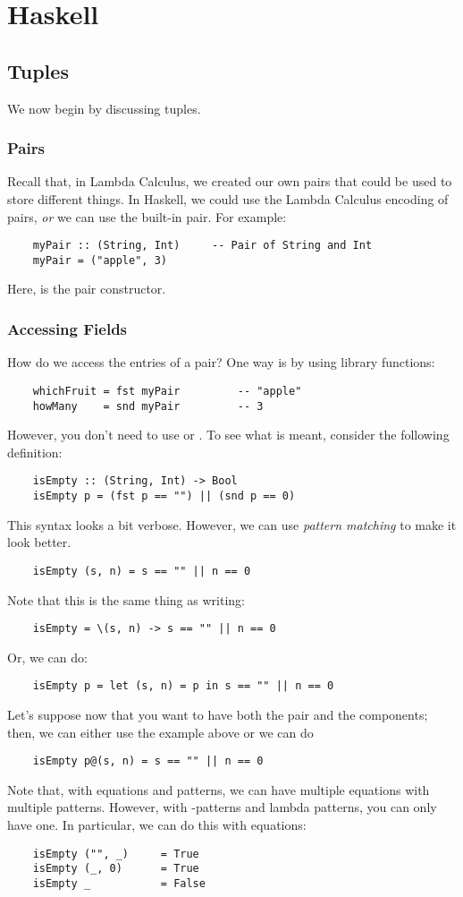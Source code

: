 \documentclass[letterpaper]{article}
\begin{document}
\section{Haskell}

\subsection{Tuples}
We now begin by discussing tuples.

\subsubsection{Pairs}
Recall that, in Lambda Calculus, we created our own pairs that could be used to store different things. In Haskell, we could use the Lambda Calculus encoding of pairs, \emph{or} we can use the built-in pair. For example: 
\begin{verbatim}
    myPair :: (String, Int)     -- Pair of String and Int 
    myPair = ("apple", 3)\end{verbatim}
Here, \code{(,)} is the pair constructor. 

\subsubsection{Accessing Fields}
How do we access the entries of a pair? One way is by using library functions:
\begin{verbatim}
    whichFruit = fst myPair         -- "apple"
    howMany    = snd myPair         -- 3 \end{verbatim}
However, you don't need to use  or . To see what is meant, consider the following definition: 
\begin{verbatim}
    isEmpty :: (String, Int) -> Bool 
    isEmpty p = (fst p == "") || (snd p == 0)\end{verbatim}
This syntax looks a bit verbose. However, we can use \emph{pattern matching} to make it look better.
\begin{verbatim}
    isEmpty (s, n) = s == "" || n == 0\end{verbatim}
Note that this is the same thing as writing: 
\begin{verbatim}
    isEmpty = \(s, n) -> s == "" || n == 0\end{verbatim}
Or, we can do: 
\begin{verbatim}
    isEmpty p = let (s, n) = p in s == "" || n == 0\end{verbatim}
Let's suppose now that you want to have both the pair and the components; then, we can either use the example above or we can do 
\begin{verbatim}
    isEmpty p@(s, n) = s == "" || n == 0\end{verbatim}
Note that, with equations and patterns, we can have multiple equations with multiple patterns. However, with -patterns and lambda patterns, you can only have one. In particular, we can do this with equations: 
\begin{verbatim}
    isEmpty ("", _)     = True 
    isEmpty (_, 0)      = True 
    isEmpty _           = False
\end{verbatim}
\end{document}
